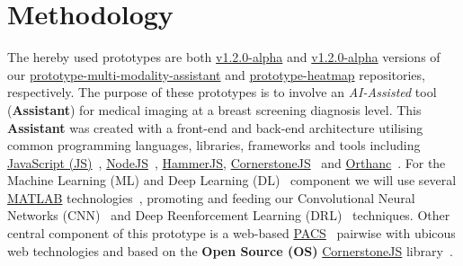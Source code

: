 
\section{Methodology}
\label{sec:sec003}

The hereby used prototypes are both \hyperlink{https://github.com/mida-project/prototype-multi-modality-assistant/releases/tag/v1.2.0-alpha}{v1.2.0-alpha} and \hyperlink{https://github.com/mida-project/prototype-heatmap/releases/tag/v1.2.0-alpha}{v1.2.0-alpha} versions of our \hyperlink{https://github.com/mida-project/prototype-multi-modality-assistant/}{prototype-multi-modality-assistant} and \hyperlink{https://github.com/mida-project/prototype-heatmap}{prototype-heatmap} repositories, respectively. The purpose of these prototypes is to involve an \textit{AI-Assisted} tool (\textbf{Assistant}) for medical imaging at a breast screening diagnosis level. This \textbf{Assistant} was created with a front-end and back-end architecture utilising common programming languages, libraries, frameworks and tools including \hyperlink{https://www.javascript.com/}{JavaScript (JS)}~\cite{flanagan2006javascript}, \hyperlink{https://nodejs.org/}{NodeJS}~\cite{wilson2018node}, \hyperlink{https://hammerjs.github.io/}{HammerJS}, \hyperlink{https://cornerstonejs.org/}{CornerstoneJS}~\cite{hostetter2018integration} and \hyperlink{https://www.orthanc-server.com/}{Orthanc}~\cite{Jodogne:ISBI2013}. For the Machine Learning (ML) and Deep Learning (DL)~\cite{ribeiro2017real, ribeiro2016real} component we will use several \hyperlink{https://www.mathworks.com/products/matlab.html}{MATLAB} technologies~\cite{vedaldi2015matconvnet}, promoting and feeding our Convolutional Neural Networks (CNN)~\cite{carneiro2015unregistered} and Deep Reenforcement Learning (DRL)~\cite{maicas2017deep} techniques. Other central component of this prototype is a web-based \hyperlink{https://www.sciencedirect.com/topics/medicine-and-dentistry/picture-archiving-and-communication-system}{PACS}~\cite{cooke2003picture} pairwise with ubicous web technologies and based on the \textbf{Open Source (OS)} \hyperlink{https://cornerstonejs.org/}{CornerstoneJS} library~\cite{feller2002understanding, hostetter2018integration}.


